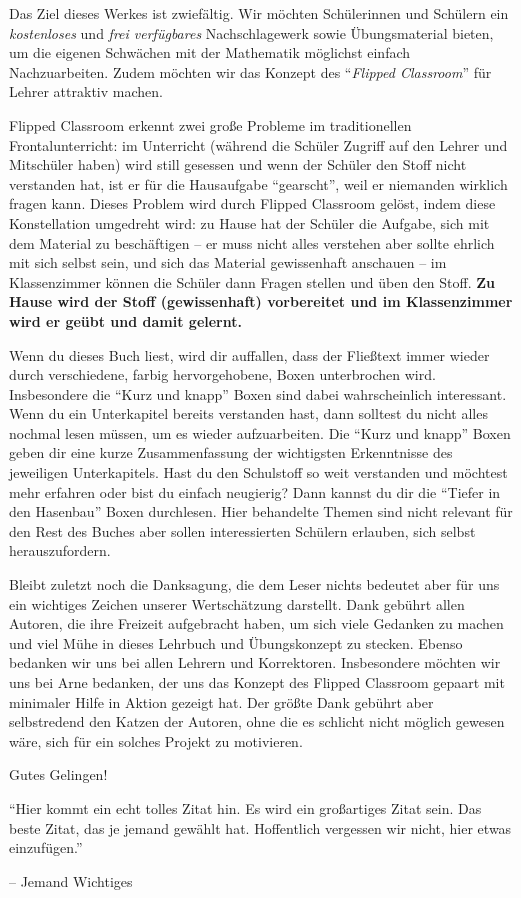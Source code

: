 \documentclass[../main.tex]{subfiles}
\begin{document}
Das Ziel dieses Werkes ist zwiefältig. Wir möchten Schülerinnen und Schülern ein \emph{kostenloses} und \emph{frei verfügbares} Nachschlagewerk sowie Übungsmaterial bieten, um die eigenen Schwächen mit der Mathematik möglichst einfach Nachzuarbeiten. Zudem möchten wir das Konzept des \enquote{\emph{Flipped Classroom}} für Lehrer attraktiv machen.

Flipped Classroom erkennt zwei große Probleme im traditionellen Frontalunterricht: im Unterricht (während die Schüler Zugriff auf den Lehrer und Mitschüler haben) wird still gesessen und wenn der Schüler den Stoff nicht verstanden hat, ist er für die Hausaufgabe \enquote{gearscht}, weil er niemanden wirklich fragen kann.
Dieses Problem wird durch Flipped Classroom gelöst, indem diese Konstellation umgedreht wird: zu Hause hat der Schüler die Aufgabe, sich mit dem Material zu beschäftigen -- er muss nicht alles verstehen aber sollte ehrlich mit sich selbst sein, und sich das Material gewissenhaft anschauen -- im Klassenzimmer können die Schüler dann Fragen stellen und üben den Stoff. \textbf{Zu Hause wird der Stoff (gewissenhaft) vorbereitet und im Klassenzimmer wird er geübt und damit gelernt.}

Wenn du dieses Buch liest, wird dir auffallen, dass der Fließtext immer wieder durch verschiedene, farbig hervorgehobene, Boxen unterbrochen wird. Insbesondere die \enquote{Kurz und knapp} Boxen sind dabei wahrscheinlich interessant. Wenn du ein Unterkapitel bereits verstanden hast, dann solltest du nicht alles nochmal lesen müssen, um es wieder aufzuarbeiten. Die \enquote{Kurz und knapp} Boxen geben dir eine kurze Zusammenfassung der wichtigsten Erkenntnisse des jeweiligen Unterkapitels. Hast du den Schulstoff so weit verstanden und möchtest mehr erfahren oder bist du einfach neugierig? Dann kannst du dir die \enquote{Tiefer in den Hasenbau} Boxen durchlesen. Hier behandelte Themen sind nicht relevant für den Rest des Buches aber sollen interessierten Schülern erlauben, sich selbst herauszufordern.

Bleibt zuletzt noch die Danksagung, die dem Leser nichts bedeutet aber für uns ein wichtiges Zeichen unserer Wertschätzung darstellt.
Dank gebührt allen Autoren, die ihre Freizeit aufgebracht haben, um sich viele Gedanken zu machen und viel Mühe in dieses Lehrbuch und Übungskonzept zu stecken. Ebenso bedanken wir uns bei allen Lehrern und Korrektoren. Insbesondere möchten wir uns bei Arne bedanken, der uns das Konzept des Flipped Classroom gepaart mit minimaler Hilfe in Aktion gezeigt hat. Der größte Dank gebührt aber selbstredend den Katzen der Autoren, ohne die es schlicht nicht möglich gewesen wäre, sich für ein solches Projekt zu motivieren.

{\hfill \Large Gutes Gelingen!}

\bigskip
\epigraph{\enquote{Hier kommt ein echt tolles Zitat hin. Es wird ein großartiges Zitat sein. Das beste Zitat, das je jemand gewählt hat. Hoffentlich vergessen wir nicht, hier etwas einzufügen.}}{-- Jemand Wichtiges}
\fi
\end{document}
